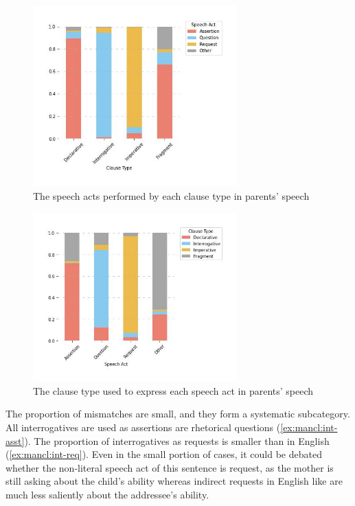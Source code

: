 \begin{figure}[H]
    \centering
    \includegraphics[width=0.7\textwidth]{figures/man-real-clsp.jpg}
    \caption{The speech acts performed by each clause type in parents' speech}
    \label{fig:man-real-clsp}
\end{figure}

\begin{figure}[H]
    \centering
    \includegraphics[width=0.7\textwidth]{figures/man-real-spcl.jpg}
    \caption{The clause type used to express each speech act in parents' speech}
    \label{fig:man-real-spcl}
\end{figure}

The proportion of mismatches are small, and they form a systematic subcategory. All interrogatives are used as assertions are rhetorical questions (\ref{ex:mancl:int-asst}). The proportion of interrogatives as requests is smaller than in English (\ref{ex:mancl:int-req}). Even in the small portion of cases, it could be debated whether the non-literal speech act of this sentence is request, as the mother is still asking about the child's ability whereas indirect requests in English like  are much less saliently about the addressee's ability. 

